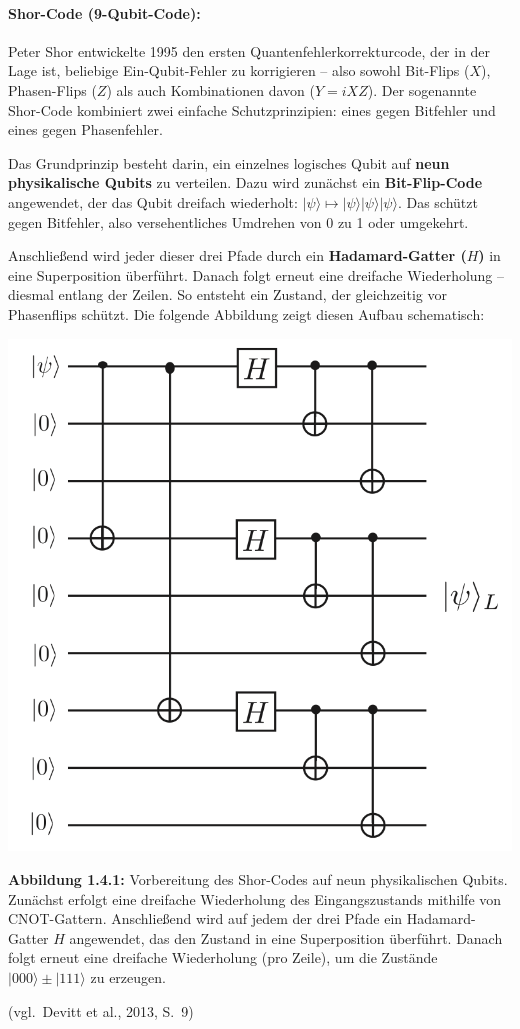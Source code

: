 \paragraph{Shor-Code (9-Qubit-Code):}

Peter Shor entwickelte 1995 den ersten Quantenfehlerkorrekturcode, der in der Lage ist, beliebige Ein-Qubit-Fehler zu korrigieren – also sowohl Bit-Flips (\(X\)), Phasen-Flips (\(Z\)) als auch Kombinationen davon (\(Y = iXZ\)). Der sogenannte Shor-Code kombiniert zwei einfache Schutzprinzipien: eines gegen Bitfehler und eines gegen Phasenfehler.

\medskip

Das Grundprinzip besteht darin, ein einzelnes logisches Qubit auf \textbf{neun physikalische Qubits} zu verteilen. Dazu wird zunächst ein \textbf{Bit-Flip-Code} angewendet, der das Qubit dreifach wiederholt: \( |\psi\rangle \mapsto |\psi\rangle |\psi\rangle |\psi\rangle \). Das schützt gegen Bitfehler, also versehentliches Umdrehen von 0 zu 1 oder umgekehrt.

Anschließend wird jeder dieser drei Pfade durch ein \textbf{Hadamard-Gatter (\(H\))} in eine Superposition überführt. Danach folgt erneut eine dreifache Wiederholung – diesmal entlang der Zeilen. So entsteht ein Zustand, der gleichzeitig vor Phasenflips schützt. Die folgende Abbildung zeigt diesen Aufbau schematisch:

\begin{center}
    \includegraphics[width=0.5\linewidth]{images/error-correction/Abb3_ShorCode_1.png}

    \vspace{0.5em}

    \par\noindent\textbf{Abbildung 1.4.1:} Vorbereitung des Shor-Codes auf neun physikalischen Qubits. Zunächst erfolgt eine dreifache Wiederholung des Eingangszustands mithilfe von CNOT-Gattern. Anschließend wird auf jedem der drei Pfade ein Hadamard-Gatter \(H\) angewendet, das den Zustand in eine Superposition überführt. Danach folgt erneut eine dreifache Wiederholung (pro Zeile), um die Zustände \(|000\rangle \pm |111\rangle\) zu erzeugen.
\end{center}
(vgl.\ Devitt et al., 2013, S.~9)

